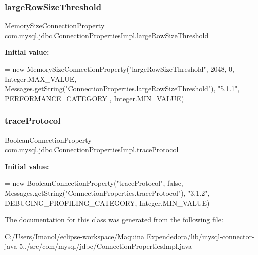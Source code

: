\subsubsection{\texorpdfstring{large\+Row\+Size\+Threshold}{largeRowSizeThreshold}}
{\footnotesize\ttfamily Memory\+Size\+Connection\+Property com.\+mysql.\+jdbc.\+Connection\+Properties\+Impl.\+large\+Row\+Size\+Threshold\hspace{0.3cm}{\ttfamily [protected]}}

{\bfseries Initial value\+:}
\begin{DoxyCode}
= \textcolor{keyword}{new} MemorySizeConnectionProperty(\textcolor{stringliteral}{"largeRowSizeThreshold"}, 2048, 0, Integer.MAX\_VALUE,
            Messages.getString(\textcolor{stringliteral}{"ConnectionProperties.largeRowSizeThreshold"}), \textcolor{stringliteral}{"5.1.1"}, PERFORMANCE\_CATEGORY
      , Integer.MIN\_VALUE)
\end{DoxyCode}
\mbox{\label{classcom_1_1mysql_1_1jdbc_1_1_connection_properties_impl_aa10ecec08e39f88f4c578004708a5559}} 
\subsubsection{\texorpdfstring{trace\+Protocol}{traceProtocol}}
{\footnotesize\ttfamily Boolean\+Connection\+Property com.\+mysql.\+jdbc.\+Connection\+Properties\+Impl.\+trace\+Protocol\hspace{0.3cm}{\ttfamily [protected]}}

{\bfseries Initial value\+:}
\begin{DoxyCode}
= \textcolor{keyword}{new} BooleanConnectionProperty(\textcolor{stringliteral}{"traceProtocol"}, \textcolor{keyword}{false},
            Messages.getString(\textcolor{stringliteral}{"ConnectionProperties.traceProtocol"}), \textcolor{stringliteral}{"3.1.2"}, DEBUGING\_PROFILING\_CATEGORY,
       Integer.MIN\_VALUE)
\end{DoxyCode}


The documentation for this class was generated from the following file\+:\begin{DoxyCompactItemize}
\item 
C\+:/\+Users/\+Imanol/eclipse-\/workspace/\+Maquina Expendedora/lib/mysql-\/connector-\/java-\/5../src/com/mysql/jdbc/Connection\+Properties\+Impl.\+java\end{DoxyCompactItemize}
